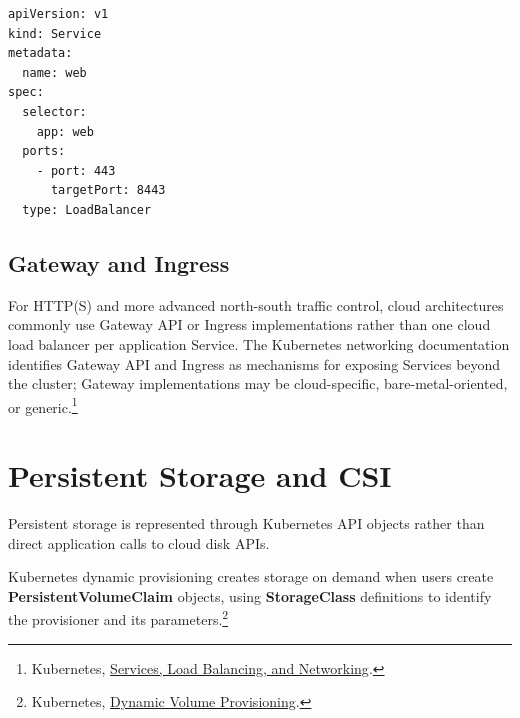 \documentclass[11pt]{article}
\newcommand{\term}[1]{\textbf{\textcolor{KubeBlue}{#1}}}
\newcommand{\src}[2]{\href{#2}{#1}}
\begin{document}
\begin{lstlisting}[style=k8syaml,caption={Minimal Kubernetes Service requesting an external load balancer}]
apiVersion: v1
kind: Service
metadata:
  name: web
spec:
  selector:
    app: web
  ports:
    - port: 443
      targetPort: 8443
  type: LoadBalancer
\end{lstlisting}

\subsection{Gateway and Ingress}
For HTTP(S) and more advanced north-south traffic control, cloud architectures commonly use Gateway API or Ingress implementations rather than one cloud load balancer per application Service. The Kubernetes networking documentation identifies Gateway API and Ingress as mechanisms for exposing Services beyond the cluster; Gateway implementations may be cloud-specific, bare-metal-oriented, or generic.\footnote{Kubernetes, \src{Services, Load Balancing, and Networking}{https://kubernetes.io/docs/concepts/services-networking/}.}

\section{Persistent Storage and CSI}

Persistent storage is represented through Kubernetes API objects rather than direct application calls to cloud disk APIs.

\begin{center}
\end{center}

Kubernetes dynamic provisioning creates storage on demand when users create \term{PersistentVolumeClaim} objects, using \term{StorageClass} definitions to identify the provisioner and its parameters.\footnote{Kubernetes, \src{Dynamic Volume Provisioning}{https://kubernetes.io/docs/concepts/storage/dynamic-provisioning/}.}
\end{document}
